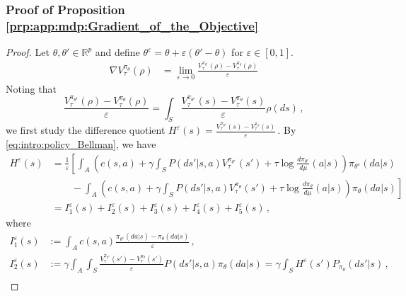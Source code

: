 \documentclass{amsart}
\theoremstyle{definition}
\begin{document}
\subsubsection{Proof of Proposition \ref{prp:app:mdp:Gradient_of_the_Objective}}
\label{sec:add_proof}

\begin{proof}
Let $\theta, \theta' \in \mathbb{R}^p$ and define $\theta^{\varepsilon}=\theta+\varepsilon (\theta'-\theta)$ for $\varepsilon\in[0,1]$. 
\begin{align*}
\nabla V_\tau^{\pi_\theta}(\rho) &= \lim_{\varepsilon \rightarrow 0}\frac{V_\tau^{\pi_{\theta^\epsilon}}(\rho) - V_\tau^{\pi_\theta}(\rho)}{\varepsilon}
\end{align*}
Noting that  
\begin{equation}\label{eq:Vtau_diff_quot}
\frac{V_\tau^{\pi_{\theta^\epsilon}}(\rho) - V_\tau^{\pi_\theta}(\rho)}{\varepsilon} = \int_{S} \frac{V^{\pi_{\theta^{\varepsilon}}}_{\tau}(s)-V^{\pi_{\theta}}_{\tau}(s)}{\varepsilon}\rho(ds)\,,
\end{equation}
we first study the difference quotient
$
H^{\varepsilon}(s)=\frac{V^{\pi_{\theta^{\varepsilon}}}_{\tau}(s)-V^{\pi_{\theta}}_{\tau}(s)}{\varepsilon}\,.
$
By \eqref{eq:intro:policy_Bellman}, we have
\begin{equation}\label{eq:first_iterate_value}
\begin{split}
H^{\varepsilon}(s)&=\frac{1}{\varepsilon}\left[\int_{A}\left(c(s,a)+\gamma\int_{S}P(ds'|s,a)V^{\pi_{\theta^{\varepsilon}}}_{\tau}(s')+\tau\log\frac{d\pi_{\theta^{\varepsilon}}}{d\mu}(a|s)\right)\pi_{\theta^{\varepsilon}}(da|s)\right.\\
&\left.\qquad-\int_{A}\left(c(s,a)+\gamma\int_{S}P(ds'|s,a)V^{\pi_{\theta}}_{\tau}(s')+\tau\log\frac{d\pi_{\theta}}{d\mu}(a|s)\right)\pi_{\theta}(da|s)\right]\\
&=I^{\varepsilon}_1(s) + I^{\varepsilon}_2(s)+I^{\varepsilon}_3(s) +I^{\varepsilon}_4(s)+I^{\varepsilon}_5(s)\,,
\end{split}
\end{equation}
where
\begin{align*}
I^{\varepsilon}_1(s)&:=\int_{A}c(s,a)\frac{\pi_{\theta^{\varepsilon}}(da|s)-\pi_{\theta}(da|s)}{\varepsilon}\,,\\
I^{\varepsilon}_2(s)&:=\gamma\int_{A}\int_{S}\frac{V^{\pi_{\theta^{\varepsilon}}}_{\tau}(s')-V^{\pi_{\theta}}_{\tau}(s')}{\varepsilon}P(ds'|s,a)\pi_{\theta}(da|s)=\gamma\int_{S} H^{\varepsilon}(s')P_{\pi_{\theta}}(ds'|s)\,,\\

\end{align*}
\end{proof}
\end{document}
